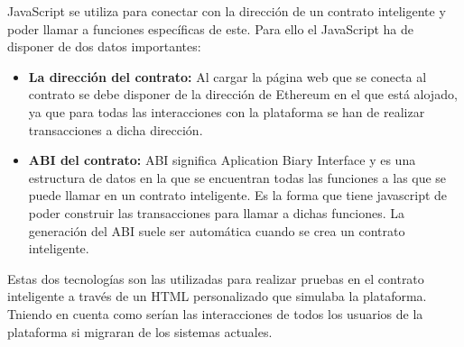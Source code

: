 JavaScript se utiliza para conectar con la dirección de un contrato inteligente
y poder llamar a funciones específicas de este. Para ello el JavaScript ha de
disponer de dos datos importantes:

\begin{itemize}
\item \textbf{La dirección del contrato:} Al cargar la página web que se conecta
  al contrato se debe disponer de la dirección de Ethereum en el que está
  alojado, ya que para todas las interacciones con la plataforma se han de
  realizar transacciones a dicha dirección.
\item \textbf{ABI del contrato:} ABI significa Aplication Biary Interface y es
  una estructura de datos en la que se encuentran todas las funciones a las que
  se puede llamar en un contrato inteligente. Es la forma que tiene javascript
  de poder construir las transacciones para llamar a dichas funciones. La
  generación del ABI suele ser automática cuando se crea un contrato
  inteligente.
\end{itemize}

Estas dos tecnologías son las utilizadas para realizar pruebas en el contrato
inteligente a través de un HTML personalizado que simulaba la plataforma.
Tniendo en cuenta como serían las interacciones de todos los usuarios de la
plataforma si migraran de los sistemas actuales.

